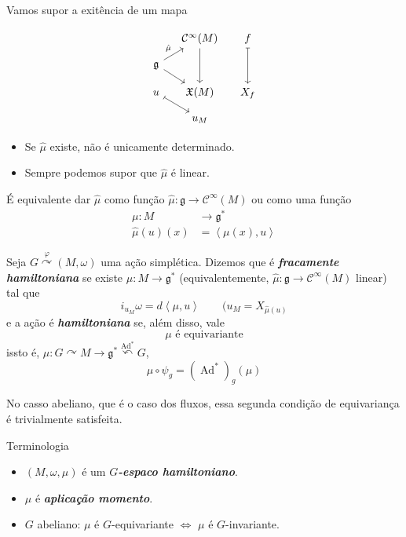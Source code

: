 Vamos supor a exitência de um mapa

\[\begin{tikzcd}[ column sep=small,row sep=small]
	&\mathcal{C}^\infty(M)\arrow[dd]& f\arrow[dd,maps to]\\
\mathfrak{g} \arrow[ur,"\hat{\mu}"]\arrow[dr]\\
u\arrow[dr, maps to]&\mathfrak{X}(M)&X_f\\
&u_M
\end{tikzcd}\]

\begin{remark}\leavevmode 
	\begin{itemize}
	\item Se $\hat{\mu}$ existe, não é unicamente determinado.
	\item Sempre podemos supor que $\hat{\mu}$ é linear.
	\end{itemize}
	\item É equivalente dar $\hat{\mu}$ como função $\hat{\mu}:\mathfrak{g} \longrightarrow \mathcal{C}^\infty(M)$ ou como uma função
		\begin{align*}
			\mu: M &\longrightarrow \mathfrak{g}^* \\
			\hat{\mu}(u)(x) & =\left<\mu(x),u\right>  
		\end{align*}	
\end{remark}

\begin{defn}\leavevmode
	Seja $G\overset{\varphi}{\curvearrowright}(M,\omega)$ uma ação simplética. Dizemos que é \textit{\textbf{fracamente hamiltoniana}} se existe  $\mu:M\to \mathfrak{g}^*$ (equivalentemente, $\hat{ \mu}:\mathfrak{g} \longrightarrow \mathcal{C}^\infty(M)$ linear) tal que
	 \begin{equation}\label{eq:a}
	i_{u_M}\omega=d\left<\mu,u\right> \qquad (u_M=X_{\hat{\mu}(u)}	 	
	 \end{equation}
	e a ação é \textit{\textbf{hamiltoniana}} se, além disso, vale
	\begin{equation}\label{eq:b}
		\mu\text{ é equivariante} 
	\end{equation}
	issto é, $\mu:G \curvearrowright M\longrightarrow \mathfrak{g}^*  \overset{\operatorname{Ad}^*}{\curvearrowleft}G$,
	\[\mu\circ \psi_g=(\operatorname{Ad}^*)_g(\mu)\]
\end{defn}

No casso abeliano, que é o caso dos fluxos, essa segunda condição de equivariança é trivialmente satisfeita.

\begin{idea5}{Terminologia}\leavevmode
	\begin{itemize}
	\item $(M,\omega,\mu)$ é um  \textit{\textbf{$G$-espaco hamiltoniano}}.
	\item $\mu$ é \textit{\textbf{aplicação momento}}.
	\item $G$ abeliano: $\mu$ é $G$-equivariante $\iff$ $\mu$ é $G$-invariante.
	\end{itemize}
\end{idea5}


